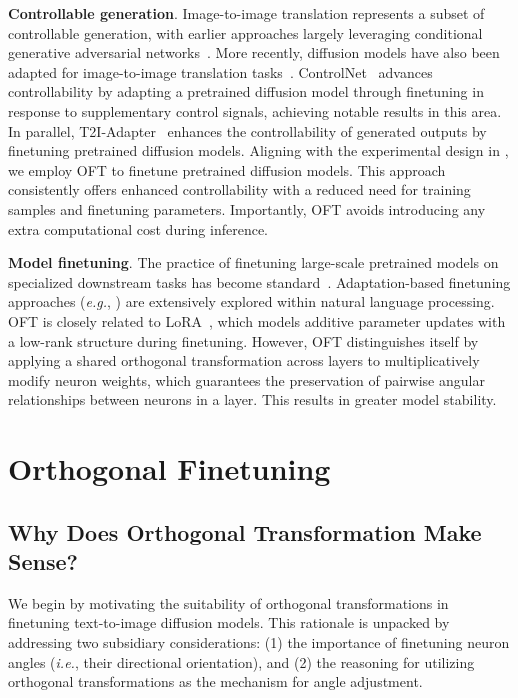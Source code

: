 \textbf{Controllable generation}. Image-to-image translation represents a subset of controllable generation, with earlier approaches largely leveraging conditional generative adversarial networks~\cite{isola2017image,zhu2017toward,wang2018high,park2019semantic,choi2018stargan}. More recently, diffusion models have also been adapted for image-to-image translation tasks~\cite{saharia2022palette,voynov2022sketch,wang2022pretraining}. ControlNet~\cite{zhang2023adding} advances controllability by adapting a pretrained diffusion model through finetuning in response to supplementary control signals, achieving notable results in this area. In parallel, T2I-Adapter~\cite{mou2023t2i} enhances the controllability of generated outputs by finetuning pretrained diffusion models. Aligning with the experimental design in \cite{zhang2023adding,mou2023t2i}, we employ OFT to finetune pretrained diffusion models. This approach consistently offers enhanced controllability with a reduced need for training samples and finetuning parameters. Importantly, OFT avoids introducing any extra computational cost during inference.

\textbf{Model finetuning}. The practice of finetuning large-scale pretrained models on specialized downstream tasks has become standard~\cite{devlin2018bert,brown2020language,he2022masked}. Adaptation-based finetuning approaches (\emph{e.g.}, \cite{hulora2022,houlsby2019parameter,pfeiffer2020adapterfusion}) are extensively explored within natural language processing. OFT is closely related to LoRA~\cite{hulora2022}, which models additive parameter updates with a low-rank structure during finetuning. However, OFT distinguishes itself by applying a shared orthogonal transformation across layers to multiplicatively modify neuron weights, which guarantees the preservation of pairwise angular relationships between neurons in a layer. This results in greater model stability.

\section{Orthogonal Finetuning}

\subsection{Why Does Orthogonal Transformation Make Sense?}

We begin by motivating the suitability of orthogonal transformations in finetuning text-to-image diffusion models. This rationale is unpacked by addressing two subsidiary considerations: (1) the importance of finetuning neuron angles (\emph{i.e.}, their directional orientation), and (2) the reasoning for utilizing orthogonal transformations as the mechanism for angle adjustment.

